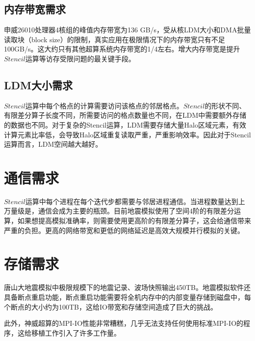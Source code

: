 \documentclass[degree=doctor]{thuthesis}
\begin{document}
\subsection{内存带宽需求}
申威26010处理器4核组的峰值内存带宽为136 GB/s，受从核LDM大小和DMA批量读取块（block size）的限制，真实应用在极限情况下的内存带宽只有不足100GB/s。这大约只有其他超算系统内存带宽的1/4左右。增大内存带宽是提升$Stencil$运算等访存受限问题的最关键手段。

\subsection{LDM大小需求}

$Stencil$运算中每个格点的计算需要访问该格点的邻居格点。$Stencil$的形状不同、有限差分算子长度不同，所需要访问的格点数量也不同，在LDM中需要额外存储的数据也不同。对于复杂的Stencil运算，LDM需要存储大量Halo区域元素，有效计算元素比率低，会导致Halo区域重复读取严重，严重影响效率。因此对于Stencil运算而言，LDM空间越大越好。

\section{通信需求}
$Stencil$运算中每个进程在每个迭代步都需要与邻居进程通信。当进程数量达到上万量级是，通信会成为主要的瓶颈。目前地震模拟使用了空间4阶的有限差分运算，如果想提高模拟准确率，则需要使用更高阶的有限差分算子，这会给通信带来严重的负担。更高的网络带宽和更低的网络延迟是高效大规模并行模拟的关键。

\section{存储需求}
唐山大地震模拟中极限规模下的地震记录、波场快照输出450TB。地震模拟软件还具备断点重启功能，断点重启功能需要将全机内存中的内部变量存储到磁盘中，每个断点的大小约为100TB，这给IO带宽和存储空间造成了巨大的挑战。

此外，神威超算的MPI-IO性能非常糟糕，几乎无法支持任何使用标准MPI-IO的程序，这给移植工作引入了许多工作量。


% 

\end{document}
